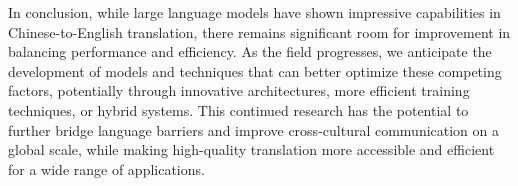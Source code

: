 \documentclass[conference]{IEEEtran}
\begin{document}
In conclusion, while large language models have shown impressive capabilities in Chinese-to-English translation, there remains significant room for improvement in balancing performance and efficiency. As the field progresses, we anticipate the development of models and techniques that can better optimize these competing factors, potentially through innovative architectures, more efficient training techniques, or hybrid systems. This continued research has the potential to further bridge language barriers and improve cross-cultural communication on a global scale, while making high-quality translation more accessible and efficient for a wide range of applications.
\fi




\end{document}
